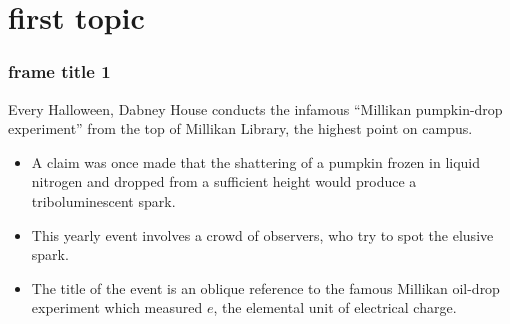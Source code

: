 \section{first topic}

\begin{frame}
\frametitle{frame title 1}
Every Halloween, Dabney House conducts the infamous ``Millikan pumpkin-drop experiment'' from the top of Millikan Library, the highest point on campus.

\begin{itemize}
    \item<1-> A claim was once made that the shattering of a pumpkin frozen in liquid nitrogen and dropped from a sufficient height would produce a triboluminescent spark. 
    \item<2-> This yearly event involves a crowd of observers, who try to spot the elusive spark.
    \item<3-> The title of the event is an oblique reference to the famous Millikan oil-drop experiment which measured $e$, the elemental unit of electrical charge.
\end{itemize}

\end{frame}